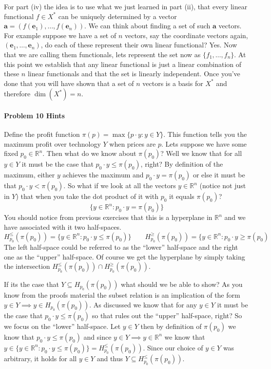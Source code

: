 \documentclass[a4paper,12pt]{article}
\begin{document}
For part (iv) the idea is to use what we just learned in part (ii), that every linear functional $f \in X^*$ can be uniquely determined by a vector $\mathbf{a} = (f(\mathbf{e}_1),\dots,f(\mathbf{e}_n))$.
We can think about finding a set of such $\mathbf{a}$ vectors.
For example suppose we have a set of $n$ vectors, say the coordinate vectors again, $(\mathbf{e}_1,\dots, \mathbf{e}_n)$, do each of these represent their own linear functional? Yes.
Now that we are calling them functionals, lets represent the set now as $\{f_1,\dots, f_n\}$.
At this point we establish that any linear functional is just a linear combination of these $n$ linear functionals and that the set is linearly independent.
Once you've done that you will have shown that a set of $n$ vectors is a basis for $X^*$ and therefore $\dim\left(X^*\right) = n$.

\paragraph{Problem 10 Hints}
Define the profit function $\pi(p) = \max\{p\cdot y : y\in Y\}$.
This function tells you the maximum profit over technology $Y$ when prices are $p$.
Lets suppose we have some fixed $p_0 \in \mathbb{R}^n$.
Then what do we know about $\pi(p_0)$?
Well we know that for all $y\in Y$ it must be the case that $p_0\cdot y \leq \pi(p_0)$, right?
By definition of the maximum, either $y$ achieves the maximum and $p_0\cdot y = \pi(p_0)$ or else it must be that $p_0\cdot y < \pi(p_0)$.
So what if we look at all the vectors $y \in \mathbb{R}^n$ (notice not just in $Y$) that when you take the dot product of it with $p_0$ it equals $\pi(p_0)$?
\[
  \{ y \in \mathbb{R}^n: p_0\cdot y = \pi(p_0) \}
\]
You should notice from previous exercises that this is a hyperplane in $\mathbb{R}^n$ and we have associated with it two half-spaces.
\[
  H^{\leq}_{p_0}(\pi(p_0)) = \{ y \in \mathbb{R}^n : p_0 \cdot y \leq \pi(p_0) \} \qquad H_{p_0}^{\geq}(\pi(p_0)) = \{ y \in \mathbb{R}^n : p_0 \cdot y \geq \pi(p_0)
\]
The left half-space could be referred to as the ``lower'' half-space and the right one as the ``upper'' half-space.
Of course we get the hyperplane by simply taking the intersection $H_{p_0}^{\leq}(\pi(p_0)) \cap H_{p_0}^{\geq}(\pi(p_0))$.

If its the case that $Y \subseteq H_{p_0}(\pi(p_0))$ what should we be able to show?
As you know from the proofs material the subset relation is an implication of the form $y\in Y \implies y \in H_{p_0}(\pi(p_0))$.
As discussed we know that for any $y \in Y$ it must be the case that $p_0\cdot y \leq \pi(p_0)$ so that rules out the ``upper'' half-space, right?
So we focus on the ``lower'' half-space.
Let $y \in Y$ then by definition of $\pi(p_0)$ we know that $p_0 \cdot y \leq \pi(p_0)$ and since $y \in Y \implies y \in \mathbb{R}^n$ we know that $y \in \{ y \in \mathbb{R}^n : p_0 \cdot y \leq \pi(p_0) \} = H_{p_0}^{\leq}(\pi(p_0))$.
Since our choice of $y \in Y$ was arbitrary, it holds for all $y \in Y$ and thus $Y\subseteq H_{p_0}^{\leq}(\pi(p_0))$.
\end{document}
